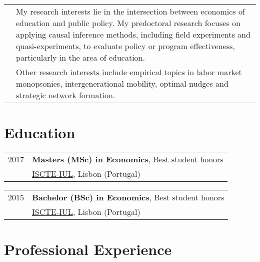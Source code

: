 \documentclass[a4paper,11pt]{article} %
\begin{document}
\begin{tabular}{rp{14cm}}
	& My research interests lie in the intersection between economics of education and public policy. My predoctoral research focuses on applying causal inference methods, including field experiments and quasi-experiments, to evaluate policy or program effectiveness, particularly in the area of education. \\
	& Other research interests include empirical topics in labor market monopsonies, intergenerational mobility, optimal nudges and strategic network formation.
\end{tabular}


\section[Education]{\faGraduationCap \hspace{3pt} Education}

\begin{tabular}{r|p{13cm}}
	2017 & \textbf{Masters (MSc) in Economics}, Best student honors \\
	&  \href{https://iscte-iul.pt/}{ISCTE-IUL}, Lisbon (Portugal) \\
\end{tabular}

\begin{tabular}{r|p{15cm}}
	2015 & \textbf{Bachelor (BSc) in Economics}, Best student honors \\ & \href{https://iscte-iul.pt/}{ISCTE-IUL}, Lisbon (Portugal)\\
\end{tabular}

\section[Professional Experience]{\faBriefcase \hspace{3pt} Professional Experience}
\end{document}
